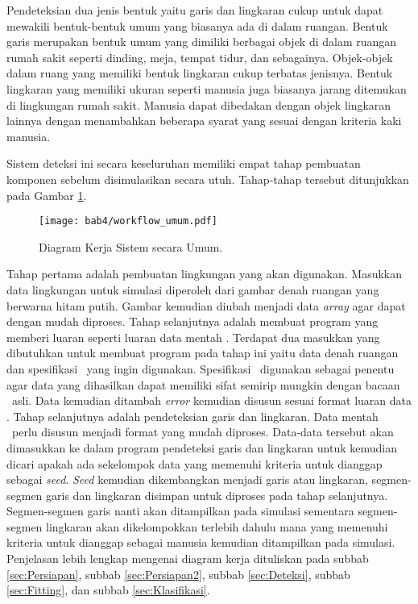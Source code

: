 Pendeteksian dua jenis bentuk yaitu garis dan lingkaran cukup untuk dapat mewakili bentuk-bentuk umum yang biasanya ada di dalam ruangan. Bentuk garis merupakan bentuk umum yang dimiliki berbagai objek di dalam ruangan rumah sakit seperti dinding, meja, tempat tidur, dan sebagainya. Objek-objek dalam ruang yang memiliki bentuk lingkaran cukup terbatas jenisnya. Bentuk lingkaran yang memiliki ukuran seperti manusia juga biasanya jarang ditemukan di lingkungan rumah sakit. Manusia dapat dibedakan dengan objek lingkaran lainnya dengan menambahkan beberapa syarat yang sesuai dengan kriteria kaki manusia.

Sistem deteksi ini secara keseluruhan memiliki empat tahap pembuatan komponen sebelum disimulasikan secara utuh. Tahap-tahap tersebut ditunjukkan pada Gambar \ref{fig:Ch04_sistem_umum}.

    \begin{figure}[H]
        \centering
        \texttt{[image: bab4/workflow\_umum.pdf]}
        \caption{Diagram Kerja Sistem secara Umum.}
        \label{fig:Ch04_sistem_umum}
    \end{figure}

Tahap pertama adalah pembuatan lingkungan yang akan digunakan. Masukkan data lingkungan untuk simulasi diperoleh dari gambar denah ruangan yang berwarna hitam putih. Gambar kemudian diubah menjadi data \textit{array} agar dapat dengan mudah diproses. Tahap selanjutnya adalah membuat program yang memberi luaran seperti luaran data mentah \lidar. Terdapat dua masukkan yang dibutuhkan untuk membuat program pada tahap ini yaitu data denah ruangan dan spesifikasi \lidar\ yang ingin digunakan. Spesifikasi \lidar\ digunakan sebagai penentu agar data yang dihasilkan dapat memiliki sifat semirip mungkin dengan bacaan \lidar\ asli. Data kemudian ditambah \textit{error} kemudian disusun sesuai format luaran data \lidar. Tahap selanjutnya adalah pendeteksian garis dan lingkaran. Data mentah \lidar\ perlu disusun menjadi format yang mudah diproses. Data-data tersebut akan dimasukkan ke dalam program pendeteksi garis dan lingkaran untuk kemudian dicari apakah ada sekelompok data yang memenuhi kriteria untuk dianggap sebagai \textit{seed}. \textit{Seed} kemudian dikembangkan menjadi garis atau lingkaran, segmen-segmen garis dan lingkaran disimpan untuk diproses pada tahap selanjutnya. Segmen-segmen garis nanti akan ditampilkan pada simulasi sementara segmen-segmen lingkaran akan dikelompokkan terlebih dahulu mana yang memenuhi kriteria untuk dianggap sebagai manusia kemudian ditampilkan pada simulasi. Penjelasan lebih lengkap mengenai diagram kerja dituliskan pada subbab \ref{sec:Persiapan}, subbab \ref{sec:Persiapan2}, subbab \ref{sec:Deteksi}, subbab \ref{sec:Fitting}, dan subbab \ref{sec:Klasifikasi}.

